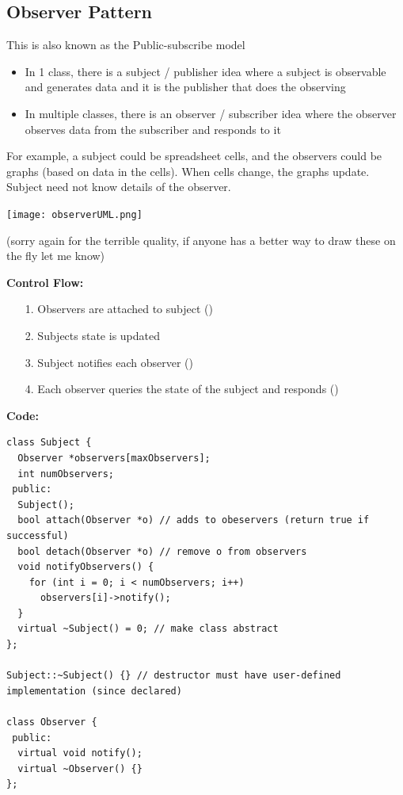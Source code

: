 \documentclass[english, 11pt]{article}
\begin{document}
\subsection{Observer Pattern}

This is also known as the Public-subscribe model
\begin{itemize}
  \item In 1 class, there is a subject / publisher idea where a subject is observable and generates data and it is the publisher that does the observing
  \item In multiple classes, there is an observer / subscriber idea where the observer observes data from the subscriber and responds to it
\end{itemize}

\begin{exmp}
  For example, a subject could be spreadsheet cells, and the observers could be graphs (based on data in the cells). When cells change, the graphs update. Subject need not know details of the observer.
  \begin{center}
    \texttt{[image: observerUML.png]}
  \end{center}
  (sorry again for the terrible quality, if anyone has a better way to draw these on the fly let me know)
\end{exmp}

\textbf{Control Flow:}

\begin{itemize}
  \item[1.] Observers are attached to subject ()
  \item[2.] Subjects state is updated
  \item[3.] Subject notifies each observer ()
  \item[4.] Each observer queries the state of the subject and responds ()
\end{itemize}

\textbf{Code:}

\begin{lstlisting}
class Subject {
  Observer *observers[maxObservers];
  int numObservers;
 public:
  Subject();
  bool attach(Observer *o) // adds to obeservers (return true if successful)
  bool detach(Observer *o) // remove o from observers
  void notifyObservers() {
    for (int i = 0; i < numObservers; i++)
      observers[i]->notify();
  }
  virtual ~Subject() = 0; // make class abstract
};

Subject::~Subject() {} // destructor must have user-defined implementation (since declared)

class Observer {
 public:
  virtual void notify();
  virtual ~Observer() {}
};
\end{lstlisting}
\end{document}
